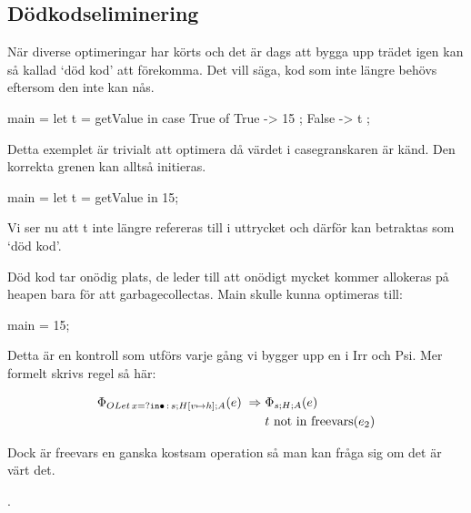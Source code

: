 \documentclass[../Optimise]{subfiles}
\begin{document}
\subsection{Dödkodseliminering}
\label{sec:DeadCode}


När diverse optimeringar har körts och det är dags att bygga upp trädet igen kan
så kallad `död kod' att förekomma. Det vill säga, kod som inte längre 
behövs eftersom den inte kan nås.

\begin{codeEx}
main = let t = getValue in
            case True of
              { True  -> 15
              ; False -> t
              };
\end{codeEx}

Detta exemplet är trivialt att optimera då värdet i casegranskaren är känd. 
Den korrekta grenen kan alltså initieras.

\begin{codeEx}
main = let t = getValue in 15;
\end{codeEx}


Vi ser nu att t inte längre refereras till i uttrycket  
och därför kan  betraktas som `död kod'. 

Död kod tar onödig plats, de leder till att onödigt mycket kommer 
allokeras på heapen bara för att garbagecollectas. Main skulle
kunna optimeras till:

\begin{codeEx}
main = 15;
\end{codeEx}




Detta är en kontroll som utförs varje gång vi bygger upp en  
i Irr och Psi. Mer formelt skrivs regel så här: 

\begin{align*}
\Phi_{OLet\,x=?\mathtt{ in }\bullet\,:\,s;H[v\mapsto h];A}(e) \; \Rightarrow \; & \Phi_{s;H;A}(e)\\
 & t \text{ not in freevars} (e_2)
\end{align*}

Dock är freevars en ganska kostsam operation så man kan fråga sig
om det är värt det.

.
\end{document}
